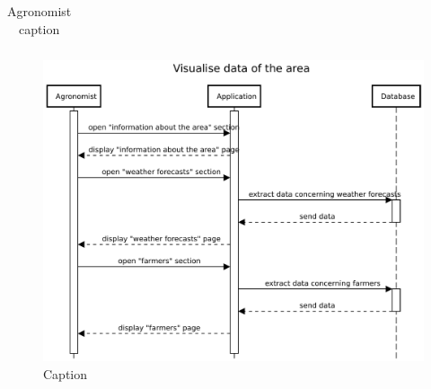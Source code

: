 \begin{table}[H]
\begin{tabular}[c]{|l|p{}|}
    \end{tabular}
    \caption{\label{tab:Area_information_access}Agronomist caption }
\end{table}

\begin{figure}[H]
    \centering
    \includegraphics[scale=0.65]{Images/Sequence diagrams/Agronomist - visualise data of the area.pdf}
    \caption{Caption}
    \label{fig:fig:seq_diag_visualize_area}
\end{figure}




